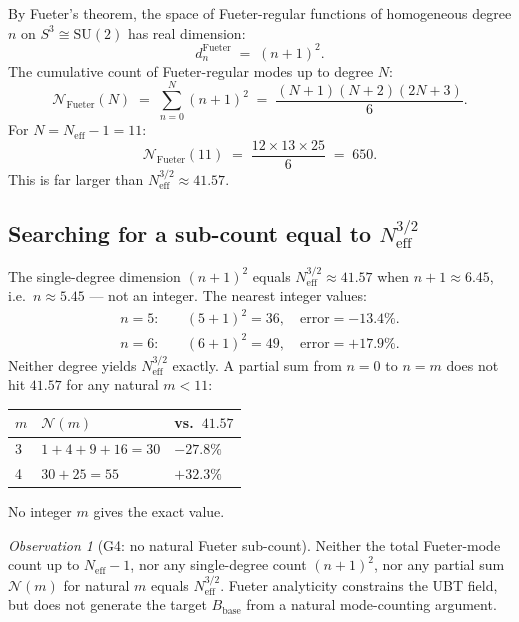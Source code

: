 \documentclass[11pt,a4paper]{article}
\theoremstyle{definition}
\theoremstyle{remark}
\newtheorem{observation}{Observation}
\begin{document}
By Fueter's theorem, the space of Fueter-regular functions of
homogeneous degree $n$ on $S^3 \cong \mathrm{SU}(2)$ has real dimension:
\begin{equation}
  d_n^{\mathrm{Fueter}}
  \;=\; (n+1)^2.
  \label{eq:Fueter_dim}
\end{equation}
The cumulative count of Fueter-regular modes up to degree $N$:
\begin{equation}
  \mathcal{N}_{\mathrm{Fueter}}(N)
  \;=\; \sum_{n=0}^{N} (n+1)^2
  \;=\; \frac{(N+1)(N+2)(2N+3)}{6}.
  \label{eq:Fueter_sum}
\end{equation}
For $N = N_{\mathrm{eff}} - 1 = 11$:
\begin{equation}
  \mathcal{N}_{\mathrm{Fueter}}(11)
  \;=\; \frac{12 \times 13 \times 25}{6}
  \;=\; 650.
  \label{eq:Fueter_N11}
\end{equation}
This is far larger than $N_{\mathrm{eff}}^{3/2} \approx 41.57$.

\subsection{Searching for a sub-count equal to $N_{\mathrm{eff}}^{3/2}$}

The single-degree dimension $(n+1)^2$ equals $N_{\mathrm{eff}}^{3/2} \approx 41.57$
when $n + 1 \approx 6.45$, i.e.\ $n \approx 5.45$ — not an integer.
The nearest integer values:
\begin{align}
  n = 5: &\quad (5+1)^2 = 36, \quad \text{error} = -13.4\%. \\
  n = 6: &\quad (6+1)^2 = 49, \quad \text{error} = +17.9\%.
  \label{eq:Fueter_nearest}
\end{align}
Neither degree yields $N_{\mathrm{eff}}^{3/2}$ exactly.
A partial sum from $n = 0$ to $n = m$ does not hit $41.57$ for any
natural $m < 11$:
\begin{center}
\begin{tabular}{lll}
  \toprule
  $m$ & $\mathcal{N}(m)$ & vs.\ $41.57$ \\
  \midrule
  3 & $1+4+9+16 = 30$ & $-27.8\%$ \\
  4 & $30 + 25 = 55$ & $+32.3\%$ \\
  \bottomrule
\end{tabular}
\end{center}
No integer $m$ gives the exact value.

\begin{observation}[G4: no natural Fueter sub-count]
  \label{obs:G4}
  Neither the total Fueter-mode count up to $N_{\mathrm{eff}} - 1$,
  nor any single-degree count $(n+1)^2$, nor any partial sum
  $\mathcal{N}(m)$ for natural $m$ equals $N_{\mathrm{eff}}^{3/2}$.
  Fueter analyticity constrains the UBT field, but does not generate the
  target $B_{\mathrm{base}}$ from a natural mode-counting argument.
\end{observation}
\end{document}
